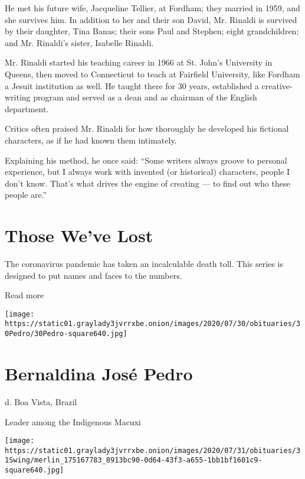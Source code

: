 He met his future wife, Jacqueline Tellier, at Fordham; they married in
1959, and she survives him. In addition to her and their son David, Mr.
Rinaldi is survived by their daughter, Tina Banas; their sons Paul and
Stephen; eight grandchildren; and Mr. Rinaldi's sister, Isabelle
Rinaldi.

Mr. Rinaldi started his teaching career in 1966 at St. John's University
in Queens, then moved to Connecticut to teach at Fairfield University,
like Fordham a Jesuit institution as well. He taught there for 30 years,
established a creative-writing program and served as a dean and as
chairman of the English department.

Critics often praised Mr. Rinaldi for how thoroughly he developed his
fictional characters, as if he had known them intimately.

Explaining his method, he once said: ``Some writers always groove to
personal experience, but I always work with invented (or historical)
characters, people I don't know. That's what drives the engine of
creating --- to find out who these people are.''

\href{https://www.nytimes3xbfgragh.onion/interactive/2020/obituaries/people-died-coronavirus-obituaries.html?action=click\&pgtype=Article\&state=default\&region=BELOW_MAIN_CONTENT\&context=covid_obits_promo}{}

\hypertarget{those-weve-lost}{%
\section{Those We've Lost}\label{those-weve-lost}}

The coronavirus pandemic has taken an incalculable death toll. This
series is designed to put names and faces to the numbers.

Read more

\texttt{[image: https://static01.graylady3jvrrxbe.onion/images/2020/07/30/obituaries/30Pedro/30Pedro-square640.jpg]}

\hypertarget{bernaldina-josuxe9-pedro}{%
\section{Bernaldina José Pedro}\label{bernaldina-josuxe9-pedro}}

d. Boa Vista, Brazil

Leader among the Indigenous Macuxi

\texttt{[image: https://static01.graylady3jvrrxbe.onion/images/2020/07/31/obituaries/31Swing/merlin\_175167783\_8913bc90-0d64-43f3-a655-1bb1bf1601c9-square640.jpg]}

